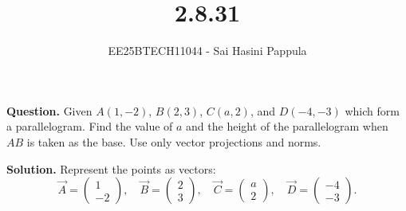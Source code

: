 \documentclass[journal]{IEEEtran}
\begin{document}

\vspace{3cm}

\title{2.8.31}
\author{EE25BTECH11044 - Sai Hasini Pappula}
 \maketitle
{\let\newpage\relax\maketitle}

\renewcommand{\thefigure}{\theenumi}
\renewcommand{\thetable}{\theenumi}
\setlength{\intextsep}{10pt} %


\renewcommand{\thetable}{\theenumi}
\textbf{Question.}  
Given $A(1,-2)$, $B(2,3)$, $C(a,2)$, and $D(-4,-3)$ which form a parallelogram.  
Find the value of $a$ and the height of the parallelogram when $AB$ is taken as the base.  
Use only vector projections and norms.

\bigskip

\textbf{Solution.}  
Represent the points as vectors:
\begin{equation}
\vec A=\begin{pmatrix}1\\-2\end{pmatrix},\quad 
\vec B=\begin{pmatrix}2\\3\end{pmatrix},\quad
\vec C=\begin{pmatrix}a\\2\end{pmatrix},\quad
\vec D=\begin{pmatrix}-4\\-3\end{pmatrix}.
\end{equation}
\end{document}
